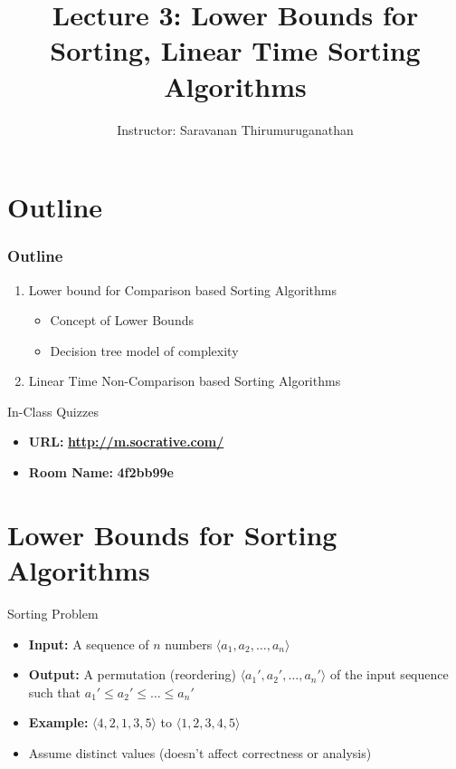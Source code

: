 \documentclass{beamer}
\title[Saravanan Thirumuruganathan] 
{Lecture 3: Lower Bounds for Sorting, Linear Time Sorting Algorithms}
\author[CSE 5311] 
{Instructor: Saravanan Thirumuruganathan}
\date[]
\begin{document}
\begin{frame}
  \titlepage
\end{frame}


\section{Outline}

\begin{frame}
\frametitle {Outline}
\begin{enumerate}
\item Lower bound for Comparison based Sorting Algorithms
\begin{itemize}
    \item Concept of Lower Bounds
    \item Decision tree model of complexity
\end{itemize}
\item Linear Time Non-Comparison based Sorting Algorithms
\end{enumerate}
\end{frame}

\begin{frame}{In-Class Quizzes}
\begin{itemize}
\item {\Large {\bf URL:}} {\LARGE \bf \url{http://m.socrative.com/}} 
\item {\Large {\bf Room Name:} {\LARGE \bf 4f2bb99e}}
\end{itemize}
\end{frame}

\section{Lower Bounds for Sorting Algorithms}

\begin{frame}{Sorting Problem}
\begin{itemize}
\item {\bf Input:} A sequence of $n$ numbers $\langle a_1, a_2, \ldots, a_n \rangle$
\item {\bf Output:} A permutation (reordering) $\langle a_1', a_2', \ldots,  a_n' \rangle$ of the input sequence
such that $a_1' \leq a_2' \leq \ldots \leq a_n'$ 
\item {\bf Example:} $\langle 4, 2, 1, 3, 5\rangle$ to $\langle 1, 2, 3, 4, 5\rangle$    
\item Assume distinct values (doesn't affect correctness or analysis)
\end{itemize}
\end{frame}
\end{document}

